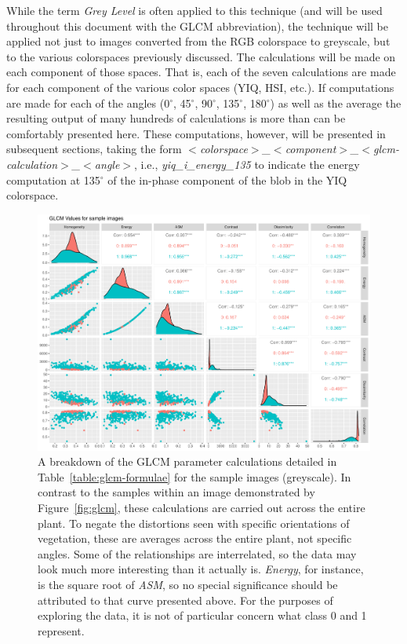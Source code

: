 \documentclass[letterpaper]{article}
\begin{document}
{While the term \textit{Grey Level} is often applied to this technique (and will be used throughout this document with the GLCM abbreviation), the technique will be applied not just to images converted from the RGB colorspace to greyscale, but to the various colorspaces previously discussed. The calculations will be made on each component of those spaces.  That is, each of the seven calculations are made for each component of the various color spaces (YIQ, HSI, etc.). If computations are made for each of the angles (0$^{\circ}$, 45$^{\circ}$, 90$^{\circ}$, 135$^{\circ}$, 180$^{\circ}$) as well as the average the resulting output of many hundreds of calculations is more than can be comfortably presented here. These computations, however, will be presented in subsequent sections, taking the form \textit{$<$colorspace$>$\_$<$component$>$\_$<$glcm-calculation$>$\_$<$angle$>$}, i.e., \textit{yiq\_i\_energy\_135} to indicate the energy computation at 135$^{\circ}$ of the in-phase component of the blob in the YIQ colorspace.

%
%

\begin{figure}[H]
	\centering
	\includegraphics[width=0.9\linewidth]{./figures/glcm-pairs.pdf}
	\caption[GLCM parameter correlation assessment]{A breakdown of the GLCM parameter calculations detailed in Table~\ref{table:glcm-formulae} for the sample images (greyscale). In contrast to the samples within an image demonstrated by Figure~\ref{fig:glcm}, these calculations are carried out across the entire plant. To negate the distortions seen with specific orientations of vegetation, these are averages across the entire plant, not specific angles. Some of the relationships are interrelated, so the data may look much more interesting than it actually is. \textit{Energy}, for instance, is the square root of \textit{ASM}, so no special significance should be attributed to that curve presented above. For the purposes of exploring the data, it is not of particular concern what class 0 and 1 represent.}
\end{figure} 

}
\end{document}
